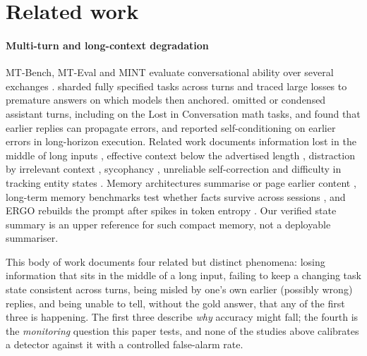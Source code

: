 \section{Related work}
\label{sec:related}

\paragraph{Multi-turn and long-context degradation}
MT-Bench, MT-Eval and MINT evaluate conversational ability over several
exchanges \citep{zheng2023judging,kwan2024mteval,wang2024mint}.
\citet{laban2025lost} sharded fully specified tasks across turns and traced
large losses to premature answers on which models then anchored.
\citet{huang2026benefit} omitted or condensed assistant turns, including on the
Lost in Conversation math tasks, and found that earlier replies can propagate
errors, and \citet{sinha2025illusion} reported self-conditioning on earlier
errors in long-horizon execution. Related work documents information lost in
the middle of long inputs \citep{liu2024lost}, effective context below the
advertised length \citep{hsieh2024ruler}, distraction by irrelevant context
\citep{shi2023distracted}, sycophancy \citep{sharma2024sycophancy}, unreliable
self-correction \citep{huang2024cannot} and difficulty in tracking entity states
\citep{kim2023entity}. Memory architectures summarise or page earlier content
\citep{packer2023memgpt,zhong2024memorybank,wang2023recursive}, long-term
memory benchmarks test whether facts survive across sessions
\citep{maharana2024locomo,wu2025longmemeval}, and ERGO
rebuilds the prompt after spikes in token entropy \citep{khalid2025ergo}. Our
verified state summary is an upper reference for such compact memory, not a
deployable summariser.

This body of work documents four related but distinct phenomena: losing
information that sits in the middle of a long input, failing to keep a
changing task state consistent across turns, being misled by one's own
earlier (possibly wrong) replies, and being unable to tell, without the gold
answer, that any of the first three is happening. The first three describe
\emph{why} accuracy might fall; the fourth is the \emph{monitoring} question
this paper tests, and none of the studies above calibrates a detector against
it with a controlled false-alarm rate.

